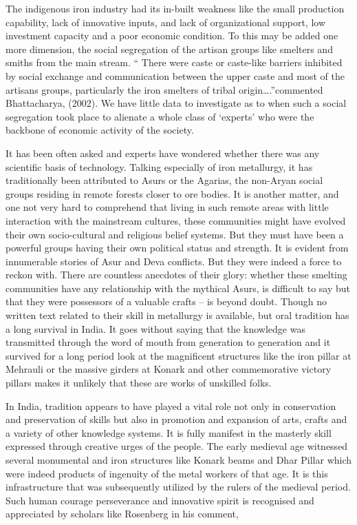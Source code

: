 The indigenous iron industry had its in-built weakness like the small production capability, lack of innovative inputs, and lack of organizational support, low investment capacity and a poor economic condition. To this may be added one more dimension, the social segregation of the artisan groups like smelters and smiths from the main stream. “ There were caste or caste-like barriers inhibited by social exchange and communication between the upper caste and most of the artisans groups, particularly the iron smelters of tribal origin….”commented Bhattacharya, (2002). We have little data to investigate as to when such a social segregation took place to alienate a whole class of `experts' who were the backbone of economic activity of the society. 

It has been often asked and experts have wondered whether there was any scientific basis of technology. Talking especially of iron metallurgy, it has traditionally been attributed to Asurs or the Agarias, the non-Aryan social groups residing in remote forests closer to ore bodies. It is another matter, and one not very hard to comprehend that living in such remote areas with little interaction with the mainstream cultures, these communities might have evolved their own socio-cultural and religious belief systems. But they must have been a powerful groups having their own political status and strength. It is evident from innumerable stories of Asur and Deva conflicts. But they were indeed a force to reckon with. There are countless anecdotes of their glory: whether these smelting communities have any relationship with the mythical Asurs, is difficult to say but that they were possessors of a valuable crafts – is beyond doubt. Though no written text related to their skill in metallurgy is available, but oral tradition has a long survival in India. It goes without saying that the knowledge was transmitted through the word of mouth from generation to generation and it survived for a long period look at the magnificent structures like the iron pillar at Mehrauli or the massive girders at Konark and other commemorative victory pillars makes it unlikely that these are works of unskilled folks.

\newpage

In India, tradition appears to have played a vital role not only in conservation and preservation of skills but also in promotion and expansion of arts, crafts and a variety of other knowledge systems. It is fully manifest in the masterly skill expressed through creative urges of the people. The early medieval age witnessed several monumental and iron structures like Konark beams and Dhar Pillar which were indeed products of ingenuity of the metal workers of that age. It is this infrastructure that was subsequently utilized by the rulers of the medieval period. Such human courage perseverance and innovative spirit is recognised and appreciated by scholars like Rosenberg in his comment,


